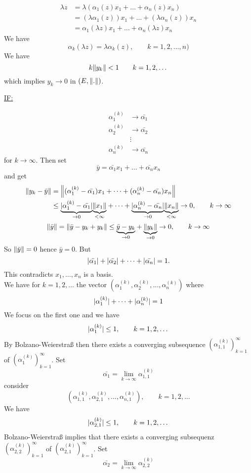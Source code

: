 \begin{beweis}
	\begin{align*}
		\lambda z &= \lambda ( \alpha_1(z)x_1+ \dots+ \alpha_n(z)x_n)  \\
		&= (\lambda \alpha_1(z))x_1 + \dots + (\lambda \alpha_n (z))x_n \\
		&= \alpha_1(\lambda z)x_1 + \dots + \alpha_n(\lambda z)x_n
	\end{align*}
	We have \[
		\alpha_k(\lambda z) = \lambda \alpha_k(z), \qquad k=1,2,\dots,n)
	\]
	We have 
	\[
		k \norm{y_k} < 1 \qquad k=1,2,\dots
	\]
	which implies $y_k \to 0$ in $(E,\norm{.})$. \\
	\begin{Large}
		\underline{IF:}
	\end{Large} \begin{align*}
		\alpha_1^{(k)} &\to \bar{\alpha_1} \\
		\alpha_2^{(k)} &\to \bar{\alpha_2} \\
		&\vdots \\
		\alpha_n^{(k)} &\to \bar{\alpha_n}
	\end{align*}
	for $k \to \infty$. Then set
	\[
		\bar{y} = \bar{\alpha_1}x_1 + \dots + \bar{\alpha_n}x_n
	\]
	and get
	\begin{align*}
		\norm{y_k-\bar{y}} &= \norm{(\alpha_1^{(k)}-\bar{\alpha_1})x_1 + \dots+ (\alpha_n^{(k)}-\bar{\alpha_n})x_n} \\
		&\leq \underset{\to 0}{\underbrace{\abs{\alpha_1^{(k)}-\bar{\alpha_1}}}}\underset{< \infty}{\underbrace{\norm{x_1}}} 
		+ \dots + \underset{\to 0}{\underbrace{\abs{\alpha_n^{(k)}-\bar{\alpha_n}}}}\underset{< \infty}{\underbrace{\norm{x_n}}} \to 0, \qquad k \to \infty
	\end{align*}
	\[
		\norm{\bar{y}} = \norm{\bar{y}-y_k + y_k} \leq \underset{\to 0}{\underbrace{\bar{y}-y_k}} + \underset{\to 0}{\underbrace{\norm{y_k}}} \to 0, \qquad k \to \infty
	\]
	So $\norm{\bar{y}} = 0$ hence $\bar{y}=0$. But
	\[
		\lvert\bar{\alpha_1}\rvert + \lvert\bar{\alpha_2}\rvert + \dots + \lvert\bar{\alpha_n}\rvert = 1.
	\]
	This contradicts $x_1, \dots,x_n$ is a basis. \\
	We have for $k= 1,2, \dots$ the vector $(\alpha_1^{(k)},\alpha_2^{(k)},\dots,\alpha_n^{(k)})$ where
	\[
		\lvert\alpha_1^{(k)}\rvert+ \dots + \lvert\alpha_n^{(k)}\rvert = 1
	\]
	We focus on the first one and we have
	\[
		\lvert\alpha_1^{(k)}\rvert \leq 1, \qquad k =1,2,\dots
	\]
	By Bolzano-Weierstraß then there exists a converging subsequence $(\alpha_{1,1}^{(k)})_{k=1}^{\infty}$ of $(\alpha_{1}^{(k)})_{k=1}^{\infty}$. Set
	\[
		\bar{\alpha_1} = \lim_{k \to \infty} \alpha_{1,1}^{(k)}
	\]
	consider
	\[
		(\alpha_{1,1}^{(k)},\alpha_{2,1}^{(k)}, \dots ,\alpha_{n,1}^{(k)}), \qquad k=1,2,\dots
	\]
	We have 
	\[
		\lvert\alpha_{2,1}^{(k)}\rvert \leq 1, \qquad k=1,2,\dots
	\]
	Bolzano-Weierstraß implies that there exists a converging subsequenz $(\alpha_{2,2}^{(k)})_{k=1}^{\infty}$ of $(\alpha_{2,1}^{(k)})_{k=1}^{\infty}$. 
	Set 
	\[
		\bar{\alpha_2} = \lim_{k \to \infty} \alpha_{2,2}^{(k)}
	\]
\end{beweis}

